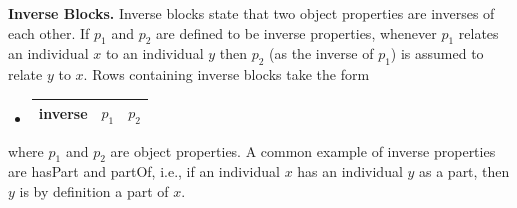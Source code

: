 \documentclass[preprint,number]{elsarticle}
\newcommand{\myblock}[1]{\vspace{12pt}\noindent\textbf{#1}}
\begin{document}
\myblock{Inverse Blocks.} Inverse blocks state that two object
properties are inverses of each other. If $p_1$ and $p_2$ are defined
to be inverse properties, whenever $p_1$ relates an individual $x$
to an individual $y$ then $p_2$ (as the inverse of $p_1$) is assumed
to relate $y$ to $x$.  Rows containing inverse blocks take the
form
\begin{itemize}
\item[]
  \begin{tabular}{|l|l|l|}\hline \textsf{inverse} & $p_1$ & $p_2$
\\ \hline
  \end{tabular}
\end{itemize}
where $p_1$ and $p_2$ are object properties. A common example of
inverse properties are \textsf{hasPart} and \textsf{partOf}, i.e., if
an individual $x$ has an individual $y$ as a part, then $y$ is
by definition a part of $x$.




\end{document}
